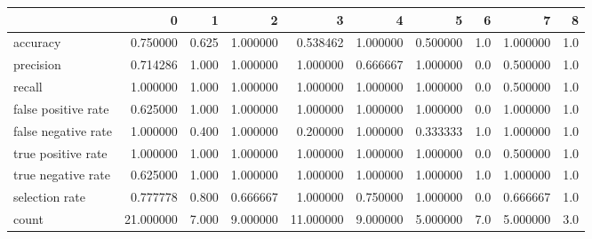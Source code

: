 \begin{tabular}{lrrrrrrrrr}
\toprule
{} &          0 &      1 &         2 &          3 &         4 &         5 &    6 &         7 &    8 \\
\midrule
accuracy            &   0.750000 &  0.625 &  1.000000 &   0.538462 &  1.000000 &  0.500000 &  1.0 &  1.000000 &  1.0 \\
precision           &   0.714286 &  1.000 &  1.000000 &   1.000000 &  0.666667 &  1.000000 &  0.0 &  0.500000 &  1.0 \\
recall              &   1.000000 &  1.000 &  1.000000 &   1.000000 &  1.000000 &  1.000000 &  0.0 &  0.500000 &  1.0 \\
false positive rate &   0.625000 &  1.000 &  1.000000 &   1.000000 &  1.000000 &  1.000000 &  0.0 &  1.000000 &  1.0 \\
false negative rate &   1.000000 &  0.400 &  1.000000 &   0.200000 &  1.000000 &  0.333333 &  1.0 &  1.000000 &  1.0 \\
true positive rate  &   1.000000 &  1.000 &  1.000000 &   1.000000 &  1.000000 &  1.000000 &  0.0 &  0.500000 &  1.0 \\
true negative rate  &   0.625000 &  1.000 &  1.000000 &   1.000000 &  1.000000 &  1.000000 &  1.0 &  1.000000 &  1.0 \\
selection rate      &   0.777778 &  0.800 &  0.666667 &   1.000000 &  0.750000 &  1.000000 &  0.0 &  0.666667 &  1.0 \\
count               &  21.000000 &  7.000 &  9.000000 &  11.000000 &  9.000000 &  5.000000 &  7.0 &  5.000000 &  3.0 \\
\bottomrule
\end{tabular}
